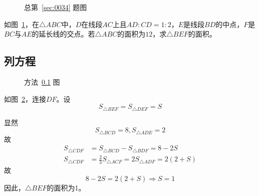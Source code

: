 

\begin{figure}[htbp]
  \centering {}
  \caption{总第~\ref{sec:0034} 题图} \label{fig:0034}
\end{figure}

如图~\ref{fig:0034}，在$\triangle ABC$中，$D$在线段$AC$上且$AD:CD = 1:2$，$E$是线段$BD$的中点，$F$是$BC$与$AE$的延长线的交点。若$\triangle ABC$的面积为$12$，求$\triangle BEF$的面积。


\subsection{列方程} \label{subsec:0034-eq}

\begin{figure}[htbp]
  \centering {}
  \caption{方法~\ref{subsec:0034-eq} 图} \label{fig:0034-eq}
\end{figure}

如图~\ref{fig:0034-eq}，连接$DF$。设
\[ S_{\triangle BEF} = S_{\triangle DEF} = S \]

显然
\[ S_{\triangle BCD} = 8, S_{\triangle ADE} = 2 \]
故
\begin{align*}
  S_{\triangle CDF} &= S_{\triangle BCD} - S_{\triangle BDF} = 8 - 2S \\
  S_{\triangle CDF} &= \frac23S_{\triangle ACF} = 2S_{\triangle ADF} = 2(2 + S)
\end{align*}
故
\[ 8 - 2S = 2(2 + S) \Rightarrow S = 1 \]
因此，$\triangle BEF$的面积为1。
